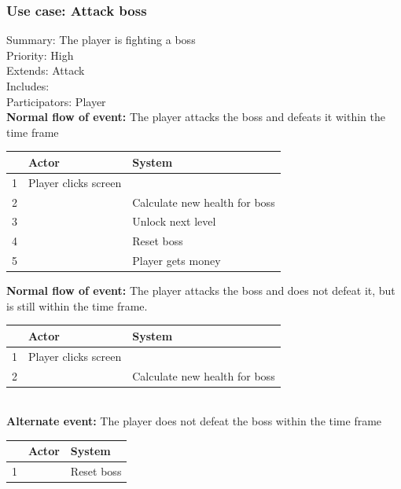 \documentclass{article}
\begin{document}
\subsubsection{Use case: Attack boss}
Summary: The player is fighting a boss \\
Priority: High \\
Extends: Attack\\
Includes: \\
Participators: Player \\
\textbf{Normal flow of event:} The player attacks the boss and defeats it within the time frame 
\vspace{1 mm}\\
\begin{tabular}{|c|l|l|} \hline
    & Actor & System \\ \hline
    1 & Player clicks screen & \\ \hline
    2 & & Calculate new health for boss \\ \hline
    3 & & Unlock next level \\ \hline
    4 & & Reset boss \\ \hline
    5 & & Player gets money \\ \hline
\end{tabular}
\newpage
\noindent
\textbf{Normal flow of event:} The player attacks the boss and does not defeat it, but is still within the time frame. 
\vspace{1 mm}\\
\begin{tabular}{|c|l|l|} \hline
    & Actor & System \\ \hline
    1 & Player clicks screen & \\ \hline
    2 & & Calculate new health for boss \\ \hline
\end{tabular}
\vspace{5 mm}\\
\textbf{Alternate event:} The player does not defeat the boss within the time frame 
\vspace{1 mm}\\
\begin{tabular}{|c|l|l|} \hline
    & Actor & System \\ \hline
    1 & & Reset boss \\ \hline
\end{tabular}

\vspace{5 mm}\\ 
\end{document}
